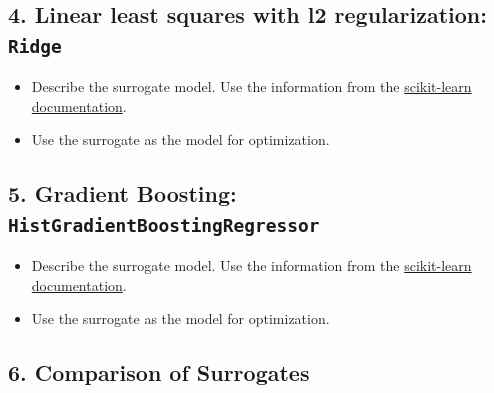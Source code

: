 \documentclass[
  letterpaper,
  DIV=11,
  numbers=noendperiod]{scrreprt}
\providecommand{\tightlist}{%
  \setlength{\itemsep}{0pt}\setlength{\parskip}{0pt}}\usepackage{longtable,booktabs,array}
\begin{document}
\subsection{\texorpdfstring{4. Linear least squares with l2
regularization:
\texttt{Ridge}}{4. Linear least squares with l2 regularization: Ridge}}\label{sec-10-exercise-04}

\begin{itemize}
\tightlist
\item
  Describe the surrogate model. Use the information from the
  \href{https://scikit-learn.org/stable/modules/generated/sklearn.linear_model.Ridge.html}{scikit-learn
  documentation}.
\item
  Use the surrogate as the model for optimization.
\end{itemize}

\subsection{\texorpdfstring{5. Gradient Boosting:
\texttt{HistGradientBoostingRegressor}}{5. Gradient Boosting: HistGradientBoostingRegressor}}\label{sec-10-exercise-05}

\begin{itemize}
\tightlist
\item
  Describe the surrogate model. Use the information from the
  \href{https://scikit-learn.org/stable/modules/generated/sklearn.ensemble.HistGradientBoostingRegressor.html\#sklearn.ensemble.HistGradientBoostingRegressor}{scikit-learn
  documentation}.
\item
  Use the surrogate as the model for optimization.
\end{itemize}

\subsection{6. Comparison of Surrogates}\label{sec-10-exercise-06}
\end{document}
